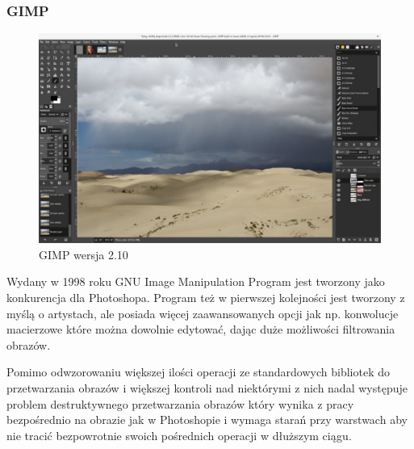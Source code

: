 \subsubsection{GIMP}
\begin{figure}[H]
    \centering
    \includegraphics{./images/Picture5.jpg}
    \caption{GIMP wersja 2.10}
    \label{fig:gimp}
\end{figure}
Wydany w 1998 roku GNU Image Manipulation Program jest tworzony jako konkurencja dla Photoshopa. Program też w pierwszej kolejności jest tworzony z myślą o artystach, ale posiada więcej zaawansowanych opcji jak np. konwolucje macierzowe które można dowolnie edytować, dając duże możliwości filtrowania obrazów.

Pomimo odwzorowaniu większej ilości operacji ze standardowych bibliotek do przetwarzania obrazów i większej kontroli nad niektórymi z nich nadal występuje problem destruktywnego przetwarzania obrazów który wynika z pracy bezpośrednio na obrazie jak w Photoshopie i wymaga starań przy warstwach aby nie tracić bezpowrotnie swoich pośrednich operacji w dłuższym ciągu.

